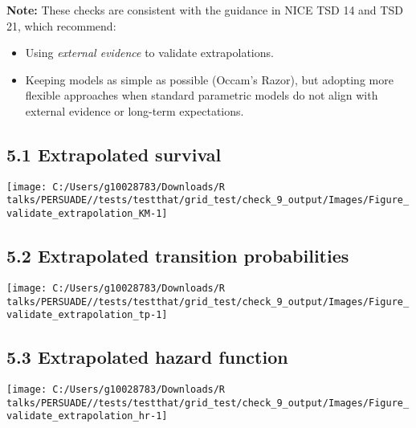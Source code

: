 \documentclass[
]{article}
\providecommand{\tightlist}{%
  \setlength{\itemsep}{0pt}\setlength{\parskip}{0pt}}
\begin{document}
\textbf{Note:} These checks are consistent with the guidance in NICE TSD
14 and TSD 21, which recommend:

\begin{itemize}
\tightlist
\item
  Using \emph{external evidence} to validate extrapolations.\\
\item
  Keeping models as simple as possible (Occam's Razor), but adopting
  more flexible approaches when standard parametric models do not align
  with external evidence or long-term expectations.
\end{itemize}

\subsection{5.1 Extrapolated survival}\label{extrapolated-survival}

\begin{flushleft}\texttt{[image: C:/Users/g10028783/Downloads/R talks/PERSUADE//tests/testthat/grid\_test/check\_9\_output/Images/Figure\_validate\_extrapolation\_KM-1]} \end{flushleft}

\clearpage

\subsection{5.2 Extrapolated transition
probabilities}\label{extrapolated-transition-probabilities}

\begin{flushleft}\texttt{[image: C:/Users/g10028783/Downloads/R talks/PERSUADE//tests/testthat/grid\_test/check\_9\_output/Images/Figure\_validate\_extrapolation\_tp-1]} \end{flushleft}

\clearpage

\subsection{5.3 Extrapolated hazard
function}\label{extrapolated-hazard-function}

\begin{flushleft}\texttt{[image: C:/Users/g10028783/Downloads/R talks/PERSUADE//tests/testthat/grid\_test/check\_9\_output/Images/Figure\_validate\_extrapolation\_hr-1]} \end{flushleft}
\end{document}
